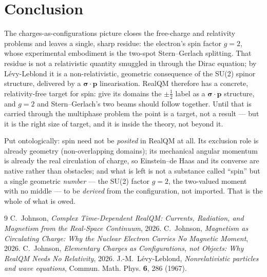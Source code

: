 \documentclass[11pt]{article}
\begin{document}
\section{Conclusion}
\label{sec:concl}

The charges-as-configurations picture closes the free-charge and relativity problems and leaves a single,
sharp residue: the electron's spin factor $g=2$, whose experimental embodiment is the two-spot
Stern--Gerlach splitting. That residue is not a relativistic quantity smuggled in through the Dirac
equation; by Lévy-Leblond it is a non-relativistic, geometric consequence of the SU(2) spinor structure,
delivered by a $\boldsymbol\sigma\cdot\mathbf p$ linearisation. RealQM therefore has a concrete,
relativity-free target for spin: give its domains the $\pm\tfrac12$ label as a $\boldsymbol\sigma\cdot
\mathbf p$ structure, and $g=2$ and Stern--Gerlach's two beams should follow together. Until that is
carried through the multiphase problem the point is a target, not a result --- but it is the right size of
target, and it is inside the theory, not beyond it.

Put ontologically: spin need not be \emph{posited} in RealQM at all. Its exclusion role is already geometry
(non-overlapping domains); its mechanical angular momentum is already the real circulation of charge, so
Einstein--de Haas and its converse are native rather than obstacles; and what is left is not a substance called
``spin'' but a single geometric \emph{number} --- the SU(2) factor $g=2$, the two-valued moment with no middle
--- to be \emph{derived} from the configuration, not imported. That is the whole of what is owed.

\begin{thebibliography}{9}
 C.~Johnson, \emph{Complex Time-Dependent RealQM: Currents, Radiation, and
Magnetism from the Real-Space Continuum}, 2026.
 C.~Johnson, \emph{Magnetism as Circulating Charge: Why the Nuclear Electron
Carries No Magnetic Moment}, 2026.
 C.~Johnson, \emph{Elementary Charges as Configurations, not Objects: Why RealQM Needs No
Relativity}, 2026.
 J.-M.~Lévy-Leblond, \emph{Nonrelativistic particles and wave equations},
Commun. Math. Phys. \textbf{6}, 286 (1967).
\end{thebibliography}
\end{document}
